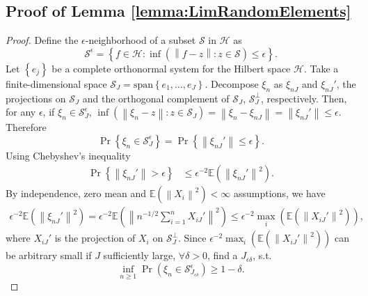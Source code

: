 \documentclass[12pt, A4]{article}
\newcommand{\SumOverN}{\sum_{i=1}^n}
\newcommand{\Norm}[1]{ \left\| #1 \right\| }
\newcommand{\Parentheses}[1]{ \left( #1 \right) }
\newcommand{\Curlybracket}[1]{ \left\{ #1 \right\} }
\newcommand{\Span}{\text{span}}
\begin{document}
    \subsection{Proof of Lemma \ref{lemma:LimRandomElements}}
    \begin{proof}
        Define the $\epsilon$-neighborhood of a subset $\mathcal{S}$ in $\mathcal{H}$ as        
            $$\mathcal{S}^{\epsilon} = \Curlybracket{ f \in \mathcal{H} : \inf \Parentheses{ \Norm{ f - z } : z \in \mathcal{S} } \leq \epsilon}.
            $$
        Let $\Curlybracket{e_j}$ be a complete orthonormal system for the Hilbert space $\mathcal{H}$. 
        Take a finite-dimensional space $\mathcal{S}_J = \Span \Curlybracket{e_1,\dots,e_J}$. 
        Decompose $\xi_n$ as $\xi_{nJ}$ and $\xi_{nJ}'$, the projections on $\mathcal{S}_J$ and the orthogonal complement of $\mathcal{S}_J$, $\mathcal{S}_J^{\perp}$, respectively.
        Then, for any $\epsilon$, if $\xi_n \in \mathcal{S}_J^{\epsilon}$, $\inf\Parentheses{ \Norm{ \xi_n - z} : z \in \mathcal{S}_J } = \Norm{\xi_n - \xi_{nJ}} = \Norm{\xi_{nJ}'} \leq \epsilon$.
        Therefore
            $$
                \Pr\Curlybracket{ \xi_n \in \mathcal{S}_J^{\epsilon} } = \Pr\Curlybracket{ \Norm{\xi_{nJ}'} \leq \epsilon }.
            $$
        Using Chebyshev's inequality 
            \begin{align*}
                \Pr \Curlybracket{ \Norm{\xi_{nJ}'} > \epsilon } &\leq \epsilon^{-2} \mathbb{E} \Parentheses{ \Norm{\xi_{nJ}'}^{2} }.
            \end{align*}
        By independence, zero mean and $\mathbb{E}\Parentheses{\Norm{X_i}^2} < \infty$ assumptions, we have
            \begin{align}\label{eq:ineq}
                \epsilon^{-2} \mathbb{E} \Parentheses{ \Norm{\xi_{nJ}'}^{2} } 
                = \epsilon^{-2} \mathbb{E} \Parentheses{ \Norm{ n^{-1/2}\SumOverN  X_{iJ}'  }^{2} }
                \leq \epsilon^{-2} \max_{i} \Parentheses{\mathbb{E}\Parentheses{ \Norm{X_{iJ}'}^2 }},
           \end{align}        
        where $X_{iJ}'$ is the projection of $X_i$ on $\mathcal{S}_J^{\perp}$.
        Since $\epsilon^{-2}\max_{i} \Parentheses{ \mathbb{E} \Parentheses{ \Norm{X_{iJ}'}^2 } }$ can be arbitrary small if $J$ sufficiently large, $\forall \delta>0$, find a $J_{\epsilon\delta}$, s.t.  
            $$
                \inf_{n\geq 1} \Pr \Parentheses{ \xi_n \in \mathcal{S}_{J_{\epsilon\delta}}^{\epsilon} } \geq 1-\delta.
$$
\end{proof}
\end{document}
